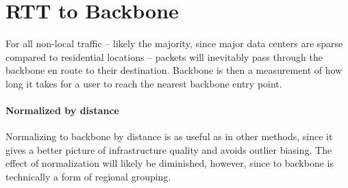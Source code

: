 


\section{RTT to Backbone}\label{sec:definition_rtt_backbone}

For all non-local traffic -- likely the majority, since major data centers are sparse compared to residential locations -- packets will inevitably pass through the backbone en route to their destination. Backbone \rtt is then a measurement of how long it takes for a user to reach the nearest backbone entry point.

\paragraph{Normalized by distance}

Normalizing \rtt to backbone by distance is as useful as in other \rtt methods, since it gives a better picture of infrastructure quality and avoids outlier biasing. The effect of normalization will likely be diminished, however, since \rtt to backbone is technically a form of regional grouping.

